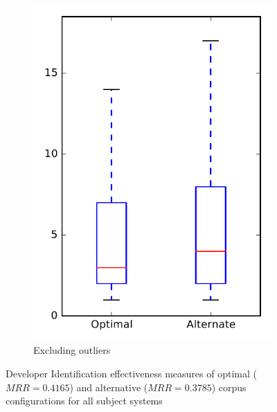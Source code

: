 \begin{figure}
\begin{subfigure}{.4\textwidth}
        \includegraphics[height=0.4\textheight]{figures/combo/dit_rq2_all_no_outlier}
        \caption{Excluding outliers}\label{fig:combo:dit:rq2:all_no_outlier}
    \end{subfigure}
\caption{Developer Identification effectiveness measures of optimal ($MRR=0.4165$) and alternative ($MRR=0.3785$) corpus configurations for all subject systems}
\label{fig:combo:dit:rq2:all}
\end{figure}
